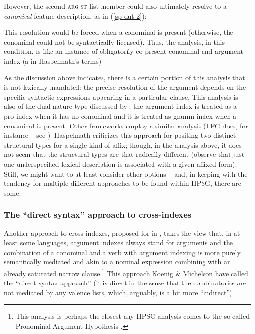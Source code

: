 \documentclass[output=paper
 	        ,biblatex
                ,babelshorthands
                ,newtxmath
                ,draftmode
                ,colorlinks, citecolor=brown
]{langscibook}
\begin{document}
However, the second \textsc{arg-st} list member could also ultimately resolve to a \textit{canonical} feature description, as in (\ref{sp dut 2}):   
%
%
\begin{exe}
\ex\label{sp dut 2}
\end{exe}
%
This resolution would be forced when a conominal is present (otherwise, the conominal could not be syntactically licensed). Thus, the analysis, in this condition, is like an instance of obligatorily co-present conominal and argument index (a  in Haspelmath's terms). 

As the discussion above indicates, there is a certain portion of this analysis that is not lexically mandated: the precise resolution of the argument depends on the specific syntactic expressions appearing in a particular clause. This analysis is also of the dual-nature type discussed by \citet{haspelmath13}: the argument index is treated as a pro-index when it has no conominal and it is treated as gramm-index when a conominal is present. Other frameworks employ a similar analysis (LFG  does, for instance -- see \citealt[Chapter~8]{BATW2015a}). Haspelmath criticizes this approach for positing two distinct structural types for a single kind of affix; though, in the analysis above, it does not seem that the structural types are that radically different (observe that just one underspecified lexical description is associated with a given affixed form). Still, we might want to at least consider other options -- and, in keeping with the tendency for multiple different approaches to be found within HPSG, there are some.  

\subsubsection{The ``direct syntax'' approach to cross-indexes}

Another approach to cross-indexes, proposed for  in \citet{KM15}, takes the view that, in at least some languages, argument indexes always stand for arguments and the combination of a conominal and a verb with argument indexing is more purely semantically mediated and akin to a nominal expression combining with an already saturated narrow clause.\footnote{This analysis is perhaps the closest any HPSG analysis comes to the so-called Pronominal Argument Hypothesis \citep{jelinek84}.} This approach Koenig \& Michelson have called the ``direct syntax approach'' (it is direct in the sense that the combinatorics are not mediated by any valence lists, which, arguably, is a bit more ``indirect''). 
\end{document}
